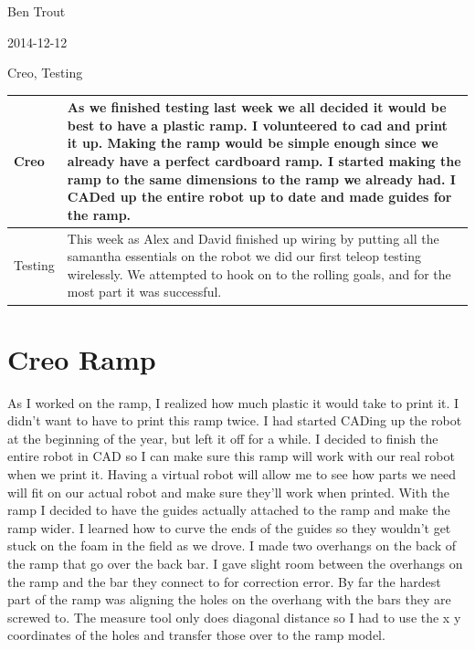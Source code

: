 Ben Trout

2014-12-12

Creo, Testing

\begin{tabular}{|p{5cm}|p{5cm}|}
\hline
Creo&
As we finished testing last week we all decided it would be best to have a plastic ramp. I volunteered to cad and print it up. Making the ramp would be simple enough since we already have a perfect cardboard ramp. I started making the ramp to the same dimensions to the ramp we already had. I CADed up the entire robot up to date and made guides for the ramp.\\
\hline
Testing&
This week as Alex and David finished up wiring by putting all the samantha essentials on the robot we did our first teleop testing wirelessly. We attempted to hook on to the rolling goals, and for the most part it was successful.  
\\
\hline
\end{tabular}

\section*{Creo Ramp}
As I worked on the ramp, I realized how much plastic it would take to print it. I didn’t want to have to print this ramp twice. I had started CADing up the robot at the beginning of the year, but left it off for a while. I decided to finish the entire robot in CAD so I can make sure this ramp will work with our real robot when we print it. Having a virtual robot will allow me to see how parts we need will fit on our actual robot and make sure they’ll work when printed. With the ramp I decided to have the guides actually attached to the ramp and make the ramp wider. I learned how to curve the ends of the guides so they wouldn’t get stuck on the foam in the field as we drove. I made two overhangs on the back of the ramp that go over the back bar. I gave slight room between the overhangs on the ramp and the bar they connect to for correction error. By far the hardest part of the ramp was aligning the holes on the overhang with the bars they are screwed to. The measure tool only does diagonal distance so I had to use the x y coordinates of the holes and transfer those over to the ramp model. 

